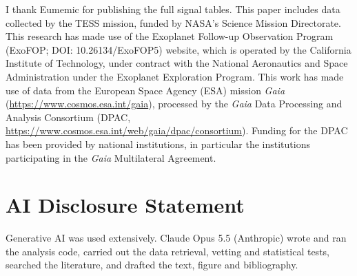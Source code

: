 \documentclass{aastex701}
\begin{document}
\begin{acknowledgments}
I thank Eumemic for publishing the full signal tables. This paper includes data collected by the TESS mission, funded by NASA's Science Mission Directorate. This research has made use of the Exoplanet Follow-up Observation Program (ExoFOP; DOI: 10.26134/ExoFOP5) website, which is operated by the California Institute of Technology, under contract with the National Aeronautics and Space Administration under the Exoplanet Exploration Program. This work has made use of data from the European Space Agency (ESA) mission {\it Gaia} (\url{https://www.cosmos.esa.int/gaia}), processed by the {\it Gaia} Data Processing and Analysis Consortium (DPAC, \url{https://www.cosmos.esa.int/web/gaia/dpac/consortium}). Funding for the DPAC has been provided by national institutions, in particular the institutions participating in the {\it Gaia} Multilateral Agreement.
\end{acknowledgments}

\section*{AI Disclosure Statement}
Generative AI was used extensively. Claude Opus 5.5 (Anthropic) wrote and ran the analysis code, carried out the data retrieval, vetting and statistical tests, searched the literature, and drafted the text, figure and bibliography.



{}

\end{document}
